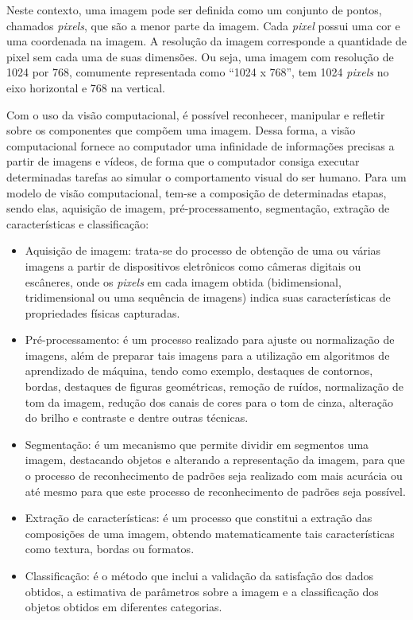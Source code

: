 \documentclass[
	12pt,				%
	oneside,			%
	a4paper,			%
	english,			%
	brazil				%
	]{abntex2ppgsi}
\begin{document}
Neste contexto, uma imagem pode ser definida como um conjunto de pontos, chamados \textit{pixels}, que são a menor parte da imagem. Cada \textit{pixel} possui uma cor e uma coordenada na imagem. A resolução da imagem corresponde a quantidade de pixel sem cada uma de suas dimensões. Ou seja, uma imagem com resolução de 1024 por 768, comumente representada como “1024 x 768”, tem 1024 \textit{pixels} no eixo horizontal e 768 na vertical.

Com o uso da visão computacional, é possível reconhecer, manipular e refletir sobre os componentes que compõem uma imagem. Dessa forma, a visão computacional fornece ao computador uma infinidade de informações precisas a partir de imagens e vídeos, de forma que o computador consiga executar determinadas tarefas ao simular o comportamento visual do ser humano. Para um modelo de visão computacional, tem-se a composição de determinadas etapas, sendo elas, aquisição de imagem, pré-processamento, segmentação, extração de características e classificação:

\begin{itemize}
  \item Aquisição de imagem: trata-se do processo de obtenção de uma ou várias imagens a partir de dispositivos eletrônicos como câmeras digitais ou escâneres, onde os \textit{pixels} em cada imagem obtida (bidimensional, tridimensional ou uma sequência de imagens) indica suas características de propriedades físicas capturadas.
  \item Pré-processamento: é um processo realizado para ajuste ou normalização de imagens, além de preparar tais imagens para a utilização em algoritmos de aprendizado de máquina, tendo como exemplo, destaques de contornos, bordas, destaques de figuras geométricas, remoção de ruídos, normalização de tom da imagem, redução dos canais de cores para o tom de cinza, alteração do brilho e contraste e dentre outras técnicas.
  \item Segmentação: é um mecanismo que permite dividir em segmentos uma imagem, destacando objetos e alterando a representação da imagem, para que o processo de reconhecimento de padrões seja realizado com mais acurácia ou até mesmo para que este processo de reconhecimento de padrões seja possível.
  \item Extração de características: é um processo que constitui a extração das composições de uma imagem, obtendo matematicamente tais características como textura, bordas ou formatos.
  \item Classificação: é o método que inclui a validação da satisfação dos dados obtidos, a estimativa de parâmetros sobre a imagem e a classificação dos objetos obtidos em diferentes categorias.
\end{itemize}
\end{document}
